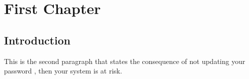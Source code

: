 \documentclass{article}
\begin{document}
\chapter{First Chapter}	
\section{Introduction}
\begin{abstract}
The security environment has a lot of attributes that collapses into
one single environment.

\end{abstract}

This is the second paragraph that states the consequence of not updating your password , then your system is at risk.
\end{document}
